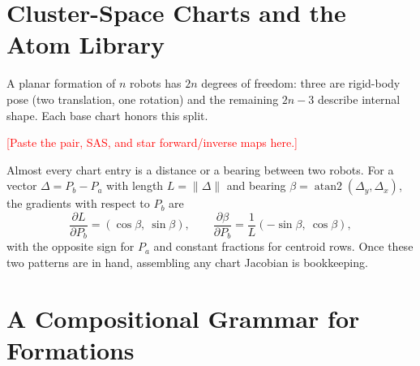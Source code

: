 \documentclass[conference]{IEEEtran}
\newcommand{\atantwo}{\operatorname{atan2}}
\newcommand{\fillnote}[1]{\textcolor{red}{[#1]}} %
\begin{document}
\section{Cluster-Space Charts and the Atom Library}
\label{sec:atoms}

A planar formation of $n$ robots has $2n$ degrees of freedom: three are rigid-body
pose (two translation, one rotation) and the remaining $2n-3$ describe internal
shape. Each base chart honors this split.

\fillnote{Paste the pair, SAS, and star forward/inverse maps here.}

Almost every chart entry is a distance or a bearing between two robots. For a
vector $\Delta = P_b - P_a$ with length $L = \lVert \Delta \rVert$ and bearing
$\beta = \atantwo(\Delta_y, \Delta_x)$, the gradients with respect to $P_b$ are
\begin{equation}
\frac{\partial L}{\partial P_b} = (\cos\beta,\ \sin\beta), \qquad
\frac{\partial \beta}{\partial P_b} = \frac{1}{L}(-\sin\beta,\ \cos\beta),
\label{eq:grads}
\end{equation}
with the opposite sign for $P_a$ and constant fractions for centroid rows. Once
these two patterns are in hand, assembling any chart Jacobian is bookkeeping.

\section{A Compositional Grammar for Formations}
\label{sec:grammar}
\end{document}
